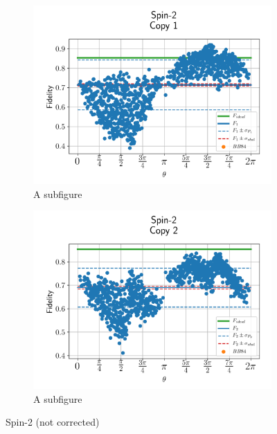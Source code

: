 \begin{figure}[H]
    \centering
    \begin{subfigure}{.5\textwidth}
      \centering
      \includegraphics[width=\textwidth]{Figures/Economical/Spin2/FullSphere/results_spin2_copy1.png}
      \caption{A subfigure}
      \label{fig:ec_spin2_sphere_1}
    \end{subfigure}%
    \begin{subfigure}{.5\textwidth}
      \centering
      \includegraphics[width=\textwidth]{Figures/Economical/Spin2/FullSphere/results_spin2_copy2.png}
      \caption{A subfigure}
      \label{fig:ec_spin2_sphere_2}
    \end{subfigure}
    \caption{Spin-2 (not corrected)}
    \label{fig:ec_spin2_sphere}
\end{figure}
